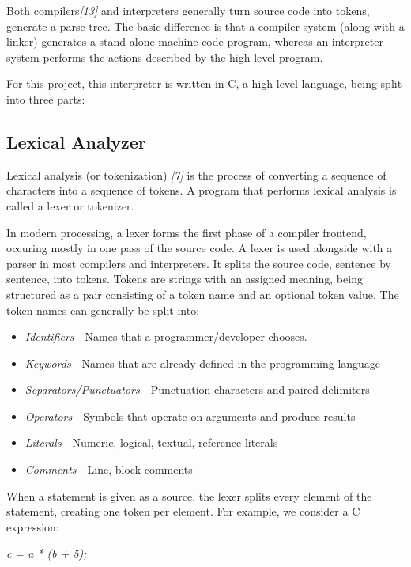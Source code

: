 \documentclass[12pt,a4paper,twoside]{report}
\begin{document}
Both compilers\textit{[13]} and interpreters generally turn source code into tokens, generate a parse tree. The basic difference is that a compiler system (along with a linker) generates a stand-alone machine code program, whereas an interpreter system performs the actions described by the high level program.

For this project, this interpreter is written in C, a high level language, being split into three parts:
\subsection{Lexical Analyzer}
	
	Lexical analysis (or tokenization) \textit{[7]} is the process of converting a sequence of characters into a sequence of tokens. A program that performs lexical analysis is called a lexer or tokenizer.
	
	In modern processing, a lexer forms the first phase of a compiler frontend, occuring mostly in one pass of the source code. A lexer is used alongside with a parser in most compilers and interpreters. It splits the source code, sentence by sentence, into tokens. Tokens are strings with an assigned meaning, being structured as a pair consisting of a token name and an optional token value. The token names can generally be split into:
	
	\begin{itemize}
		\item \textit{Identifiers} - Names that a programmer/developer chooses.
		\item \textit{Keywords} - Names that are already defined in the programming language
		\item \textit{Separators/Punctuators} - Punctuation characters and paired-delimiters
		\item \textit{Operators} - Symbols that operate on arguments and produce results
		\item \textit{Literals} - Numeric, logical, textual, reference literals
		\item \textit{Comments} - Line, block comments 
	\end{itemize}
	
	When a statement is given as a source, the lexer splits every element of the statement, creating one token per element. For example, we consider a C expression: 
	
	\textit{c = a * (b + 5);}
	
\end{document}
